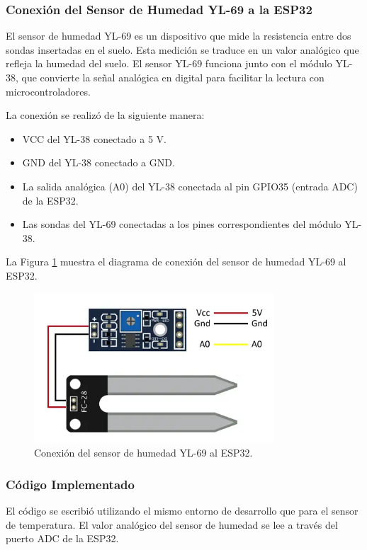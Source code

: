 \subsubsection{Conexión del Sensor de Humedad YL-69 a la ESP32}
El sensor de humedad YL-69 es un dispositivo que mide la resistencia entre dos sondas insertadas en el suelo. Esta medición se traduce en un valor analógico que refleja la humedad del suelo. El sensor YL-69 funciona junto con el módulo YL-38, que convierte la señal analógica en digital para facilitar la lectura con microcontroladores.

La conexión se realizó de la siguiente manera\citep{higrometroFC-28}:

\begin{itemize}
    \item VCC del YL-38 conectado a 5 V.
    \item GND del YL-38 conectado a GND.
    \item La salida analógica (A0) del YL-38 conectada al pin GPIO35 (entrada ADC) de la ESP32.
    \item Las sondas del YL-69 conectadas a los pines correspondientes del módulo YL-38.
\end{itemize}

La Figura \ref{fig:conexion_yl69} muestra el diagrama de conexión del sensor de humedad YL-69 al ESP32.

\begin{figure}[h]
    \centering
    \includegraphics[width=0.8\textwidth]{./Figures/Pruebas/conexion_yl69.png}
    \caption{Conexión del sensor de humedad YL-69 al ESP32.}
    \label{fig:conexion_yl69}
\end{figure}

\subsubsection{Código Implementado}
El código se escribió utilizando el mismo entorno de desarrollo que para el sensor de temperatura. El valor analógico del sensor de humedad se lee a través del puerto ADC de la ESP32.

